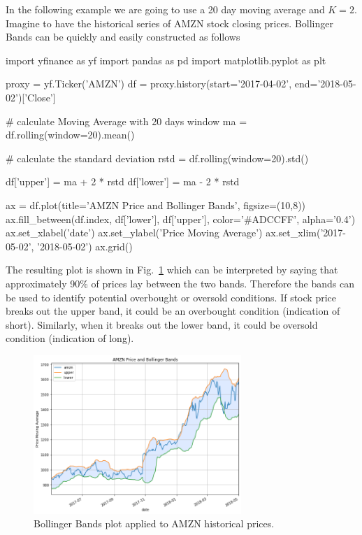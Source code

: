 In the following example we are going to use a 20 day moving average and $K=2$. Imagine to have the historical series of AMZN stock closing prices. Bollinger Bands can be quickly and easily constructed as follows 

\begin{ipython}
import yfinance as yf
import pandas as pd
import matplotlib.pyplot as plt

proxy = yf.Ticker('AMZN')
df = proxy.history(start='2017-04-02', end='2018-05-02')['Close']

# calculate Moving Average with 20 days window
ma = df.rolling(window=20).mean()

# calculate the standard deviation
rstd = df.rolling(window=20).std()

df['upper'] = ma + 2 * rstd
df['lower'] = ma - 2 * rstd

ax = df.plot(title='AMZN Price and Bollinger Bands', figsize=(10,8))
ax.fill_between(df.index, df['lower'], df['upper'], color='#ADCCFF', alpha='0.4')
ax.set_xlabel('date')
ax.set_ylabel('Price Moving Average')
ax.set_xlim('2017-05-02', '2018-05-02')
ax.grid()
\end{ipython}

The resulting plot is shown in Fig.~\ref{fig:bollinger_bands} which can be interpreted by saying that approximately 90\% of prices lay between the two bands. Therefore the bands can be used to identify potential overbought or oversold conditions. If stock price breaks out the upper band, it could be an overbought condition (indication of short). Similarly, when it breaks out the lower band, it could be oversold condition (indication of long). 

\begin{figure}[htb]
	\centering
	\includegraphics[width=0.7\textwidth]{figures/bollinger_bands}
	\caption{Bollinger Bands plot applied to AMZN historical prices.}
	\label{fig:bollinger_bands}
\end{figure}

